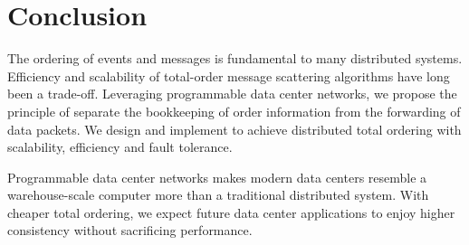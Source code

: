 \section{Conclusion}
\label{sec:conclusion}

The ordering of events and messages is fundamental to many distributed systems. Efficiency and scalability of total-order message scattering algorithms have long been a trade-off. Leveraging programmable data center networks, we propose the principle of separate the bookkeeping of order information from the forwarding of data packets. We design and implement \sys to achieve distributed total ordering with scalability, efficiency and fault tolerance.

Programmable data center networks makes modern data centers resemble a warehouse-scale computer more than a traditional distributed system. With cheaper total ordering, we expect future data center applications to enjoy higher consistency without sacrificing performance.